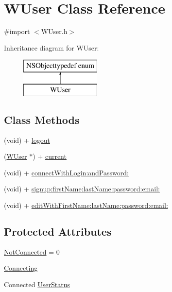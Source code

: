 \hypertarget{interface_w_user}{\section{W\-User Class Reference}
\label{interface_w_user}
}


{\ttfamily \#import $<$W\-User.\-h$>$}

Inheritance diagram for W\-User\-:\begin{figure}[H]
\begin{center}
\leavevmode
\includegraphics[height=2.000000cm]{interface_w_user}
\end{center}
\end{figure}
\subsection*{Class Methods}
\begin{DoxyCompactItemize}
\item 
(void) + \hyperlink{interface_w_user_a1d09fbcf3db3306102cfaca38cdef52c}{logout}
\item 
(\hyperlink{interface_w_user}{W\-User} $\ast$) + \hyperlink{interface_w_user_a64e945b5a2369deeb10863a8b2da88b4}{current}
\item 
(void) + \hyperlink{interface_w_user_ad2c06066b38a027578a5fb98e3d178a6}{connect\-With\-Login\-:and\-Password\-:}
\item 
(void) + \hyperlink{interface_w_user_aa4e75794216c587e5905bf96b4848f44}{signup\-:first\-Name\-:last\-Name\-:password\-:email\-:}
\item 
(void) + \hyperlink{interface_w_user_ae3161c83719088aad378f41be79687a5}{edit\-With\-First\-Name\-:last\-Name\-:password\-:email\-:}
\end{DoxyCompactItemize}
\subsection*{Protected Attributes}
\begin{DoxyCompactItemize}
\item 
\hyperlink{interface_w_user_aeb586fdedc7737f46fdc62f4db5a13f8}{Not\-Connected} = 0
\item 
\hyperlink{interface_w_user_a1469e26a4f64967c3602f8ee5ae2acb1}{Connecting}
\item 
Connected \hyperlink{interface_w_user_a5e79d8246a2ab96a7280c1d7aa5819d5}{User\-Status}
\end{DoxyCompactItemize}
